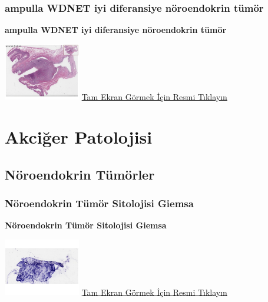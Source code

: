 \documentclass[
  letterpaper,
  DIV=11,
  numbers=noendperiod]{scrreprt}
\begin{document}
\hypertarget{sec-WDNET-ampulla}{%
\section{ampulla WDNET iyi diferansiye nöroendokrin
tümör}\label{sec-WDNET-ampulla}}

\textbf{ampulla WDNET iyi diferansiye nöroendokrin tümör}

\href{https://images.patolojiatlasi.com/WDNET-ampulla/HE.html}{\includegraphics[width=0.25\textwidth,height=\textheight]{./screenshots/thumbnail_WDNET-ampulla.png}}
\href{https://images.patolojiatlasi.com/WDNET-ampulla/HE.html}{Tam Ekran
Görmek İçin Resmi Tıklayın}

\part{Akciğer Patolojisi}

\hypertarget{sec-noroendokrin-tumorler}{%
\chapter{Nöroendokrin Tümörler}\label{sec-noroendokrin-tumorler}}

\hypertarget{sec-noroendokrin-tumor-sitolojisi-giemsa}{%
\section{Nöroendokrin Tümör Sitolojisi
Giemsa}\label{sec-noroendokrin-tumor-sitolojisi-giemsa}}

\textbf{Nöroendokrin Tümör Sitolojisi Giemsa}

\href{https://images.patolojiatlasi.com/neuroendocrine-cytology/giemsa.html}{\includegraphics[width=0.25\textwidth,height=\textheight]{./screenshots/thumbnail_neuroendocrine-cytology-giemsa.png}}
\href{https://images.patolojiatlasi.com/neuroendocrine-cytology/giemsa.html}{Tam
Ekran Görmek İçin Resmi Tıklayın}
\end{document}
